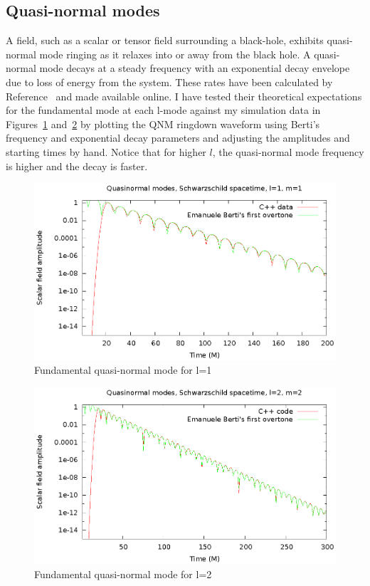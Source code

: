 \subsection{Quasi-normal modes}
A field, such as a scalar or tensor field surrounding a black-hole, exhibits quasi-normal mode ringing as it relaxes into or away from the black hole. A quasi-normal mode decays at a steady frequency with an exponential decay envelope due to loss of energy from the system. These rates have been calculated by Reference~\cite{bertiSchwQNM} and made available online. I have tested their theoretical expectations for the fundamental mode at each l-mode against my simulation data in Figures~\ref{qnml1m1} and~\ref{qnml2m2} by plotting the QNM ringdown waveform using Berti's frequency and exponential decay parameters and adjusting the amplitudes and starting times by hand. Notice that for higher $l$, the quasi-normal mode frequency is higher and the decay is faster.

\begin{figure}
  \includegraphics{l1m1qnm}
  \caption{Fundamental quasi-normal mode for l=1}
  \label{qnml1m1}
\end{figure}

\begin{figure}
  \includegraphics{l2m2qnm}
  \caption{Fundamental quasi-normal mode for l=2}
  \label{qnml2m2}
\end{figure}


